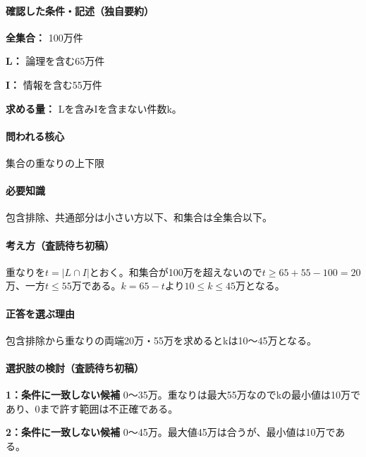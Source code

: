 \paragraph{確認した条件・記述（独自要約）}\mbox{}\par

\noindent\textbf{全集合：} 100万件\par

\noindent\textbf{L：} 論理を含む65万件\par

\noindent\textbf{I：} 情報を含む55万件\par

\noindent\textbf{求める量：} Lを含みIを含まない件数k。\par

\paragraph{問われる核心} 集合の重なりの上下限

\paragraph{必要知識} 包含排除、共通部分は小さい方以下、和集合は全集合以下。

\paragraph{考え方（査読待ち初稿）} 重なりを\(t=|L\cap I|\)とおく。和集合が100万を超えないので\(t\ge65+55-100=20\)万、一方\(t\le55\)万である。\(k=65-t\)より\(10\le k\le45\)万となる。

\paragraph{正答を選ぶ理由} 包含排除から重なりの両端20万・55万を求めるとkは10〜45万となる。

\paragraph{選択肢の検討（査読待ち初稿）}\mbox{}\par

\noindent\textbf{1：条件に一致しない候補} 0〜35万。重なりは最大55万なのでkの最小値は10万であり、0まで許す範囲は不正確である。\par

\noindent\textbf{2：条件に一致しない候補} 0〜45万。最大値45万は合うが、最小値は10万である。\par

